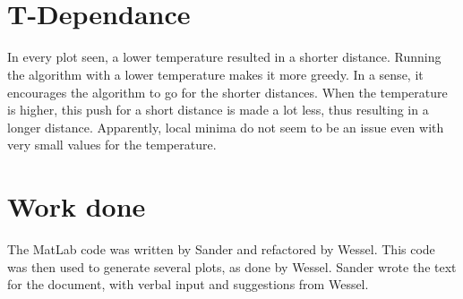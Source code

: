 \documentclass[10pt,a4paper]{article}
\begin{document}
 \\

 \\

\section{T-Dependance}
In every plot seen, a lower temperature resulted in a shorter distance. Running the algorithm with a lower temperature makes it more greedy. In a sense, it encourages the algorithm to go for the shorter distances. When the temperature is higher, this push for a short distance is made a lot less, thus resulting in a longer distance. Apparently, local minima do not seem to be an issue even with very small values for the temperature.

\section{Work done}
The MatLab code was written by Sander and refactored by Wessel. 
This code was then used to generate several plots, as done by Wessel. Sander wrote the text for the document, with verbal input and suggestions from Wessel.
\end{document}
